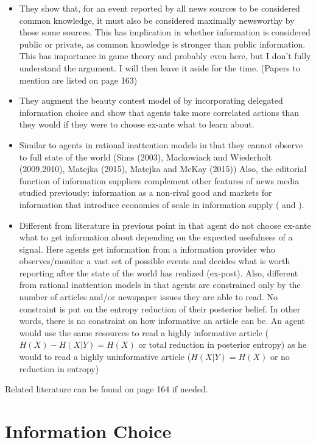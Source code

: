 \begin{itemize}
    \item They show that, for an event reported by all news sources to be considered common knowledge, it must also be considered maximally newsworthy by those some sources. This has implication in whether information is considered public or private, as common knowledge is stronger than public information. This has importance in game theory and probably even here, but I don't fully understand the argument. I will then leave it aside for the time. (Papers to mention are listed on page 163)
    \item They augment the beauty contest model of \textcite{Morris2002} by incorporating delegated information choice and show that agents take more correlated actions than they would if they were to choose ex-ante what to learn about.
    \item Similar to agents in rational inattention models in that they cannot observe to full state of the world (Sims (2003), Mackowiack and Wiederholt (2009,2010), Matejka (2015), Matejka and McKay (2015))
    Also, the editorial function of information suppliers complement other features of news media studied previously: information as a non-rival good and markets for information that introduce economies of scale in information supply (\textcite{Veldkamp2006} and \textcite{Veldkamp2006a}).
    \item Different from literature in previous point in that agent do not choose ex-ante what to get information about depending on the expected usefulness of a signal. Here agents get information from a information provider who observes/monitor a vast set of possible events and decides what is worth reporting after the state of the world has realized (ex-post).
    Also, different from rational inattention models in that agents are constrained only by the number of articles and/or newspaper issues they are able to read. No constraint is put on the entropy reduction of their posterior belief. In other words, there is no constraint on how informative an article can be. An agent would use the same resources to read a highly informative article ($H(X)-H(X|Y)=H(X)$ or total reduction in posterior entropy) as he would to read a highly uninformative article ($H(X|Y)=H(X)$ or no reduction in entropy)
\end{itemize}

Related literature can be found on page 164 if needed.


\clearpage
\section{Information Choice}

